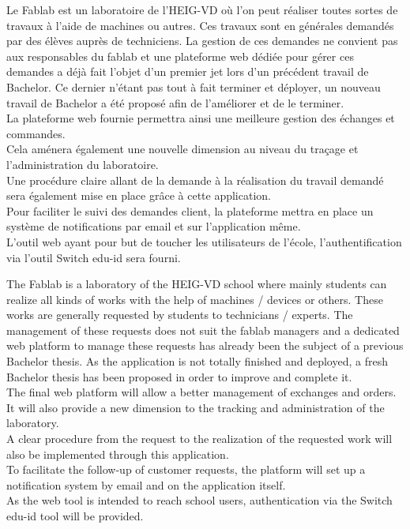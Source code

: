 Le Fablab est un laboratoire de l'HEIG-VD où l'on peut réaliser toutes sortes de travaux à l'aide de machines ou autres. Ces travaux sont en générales demandés par des élèves auprès de techniciens. La gestion de ces demandes ne convient pas aux responsables du fablab et une plateforme web dédiée pour gérer ces demandes a déjà fait l'objet d'un premier jet lors d'un précédent travail de Bachelor. Ce dernier n'étant pas tout à fait terminer et déployer, un nouveau travail de Bachelor a été proposé afin de l'améliorer et de le terminer.\\
La plateforme web fournie permettra ainsi une meilleure gestion des échanges et commandes.\\
Cela aménera également une nouvelle dimension au niveau du traçage et l'administration du laboratoire.\\
Une procédure claire allant de la demande à la réalisation du travail demandé sera également mise en place grâce à cette application.\\
Pour faciliter le suivi des demandes client, la plateforme mettra en place un système de notifications par email et sur l'application même.\\
L'outil web ayant pour but de toucher les utilisateurs de l'école, l'authentification via l'outil Switch edu-id sera fourni.\\

\asterism

The Fablab is a laboratory of the HEIG-VD school where mainly students can realize all kinds of works with the help of machines / devices or others. These works are generally requested by students to technicians / experts. The management of these requests does not suit the fablab managers and a dedicated web platform to manage these requests has already been the subject of a previous Bachelor thesis. As the application is not totally finished and deployed, a fresh Bachelor thesis has been proposed in order to improve and complete it.\\
The final web platform will allow a better management of exchanges and orders.\\
It will also provide a new dimension to the tracking and administration of the laboratory.\\
A clear procedure from the request to the realization of the requested work will also be implemented through this application.\\
To facilitate the follow-up of customer requests, the platform will set up a notification system by email and on the application itself.\\
As the web tool is intended to reach school users, authentication via the Switch edu-id tool will be provided.\\